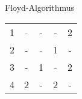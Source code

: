 \begin{example}{Floyd-Algorithmus}
\begin{center}
\begin{tabular}[t]{|c|cccc|}
            \hline
            1 & \textcolor{gray}{-} & -                   & -                   & 2 \\
            2 & -                   & \textcolor{gray}{-} & 1                   & - \\
            3 & -                   & 1                   & \textcolor{gray}{-} & 2 \\
            4 & 2                   & -                   & 2                   & - \\
            \hline
        \end{tabular}
    \end{center}
\end{example}